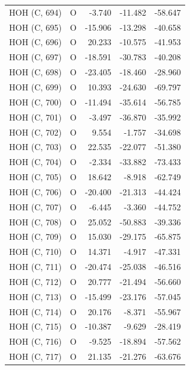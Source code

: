 \begin{longtable}{@{}lcrr@{}}
  \cmidrule(r){1-5}
  HOH (C, 694) & O & -3.740 & -11.482 & -58.647 \\
  \cmidrule(r){1-5}
  HOH (C, 695) & O & -15.906 & -13.298 & -40.658 \\
  \cmidrule(r){1-5}
  HOH (C, 696) & O & 20.233 & -10.575 & -41.953 \\
  \cmidrule(r){1-5}
  HOH (C, 697) & O & -18.591 & -30.783 & -40.208 \\
  \cmidrule(r){1-5}
  HOH (C, 698) & O & -23.405 & -18.460 & -28.960 \\
  \cmidrule(r){1-5}
  HOH (C, 699) & O & 10.393 & -24.630 & -69.797 \\
  \cmidrule(r){1-5}
  HOH (C, 700) & O & -11.494 & -35.614 & -56.785 \\
  \cmidrule(r){1-5}
  HOH (C, 701) & O & -3.497 & -36.870 & -35.992 \\
  \cmidrule(r){1-5}
  HOH (C, 702) & O & 9.554 & -1.757 & -34.698 \\
  \cmidrule(r){1-5}
  HOH (C, 703) & O & 22.535 & -22.077 & -51.380 \\
  \cmidrule(r){1-5}
  HOH (C, 704) & O & -2.334 & -33.882 & -73.433 \\
  \cmidrule(r){1-5}
  HOH (C, 705) & O & 18.642 & -8.918 & -62.749 \\
  \cmidrule(r){1-5}
  HOH (C, 706) & O & -20.400 & -21.313 & -44.424 \\
  \cmidrule(r){1-5}
  HOH (C, 707) & O & -6.445 & -3.360 & -44.752 \\
  \cmidrule(r){1-5}
  HOH (C, 708) & O & 25.052 & -50.883 & -39.336 \\
  \cmidrule(r){1-5}
  HOH (C, 709) & O & 15.030 & -29.175 & -65.875 \\
  \cmidrule(r){1-5}
  HOH (C, 710) & O & 14.371 & -4.917 & -47.331 \\
  \cmidrule(r){1-5}
  HOH (C, 711) & O & -20.474 & -25.038 & -46.516 \\
  \cmidrule(r){1-5}
  HOH (C, 712) & O & 20.777 & -21.494 & -56.660 \\
  \cmidrule(r){1-5}
  HOH (C, 713) & O & -15.499 & -23.176 & -57.045 \\
  \cmidrule(r){1-5}
  HOH (C, 714) & O & 20.176 & -8.371 & -55.967 \\
  \cmidrule(r){1-5}
  HOH (C, 715) & O & -10.387 & -9.629 & -28.419 \\
  \cmidrule(r){1-5}
  HOH (C, 716) & O & -9.525 & -18.894 & -57.562 \\
  \cmidrule(r){1-5}
  HOH (C, 717) & O & 21.135 & -21.276 & -63.676 \\

\end{longtable}
